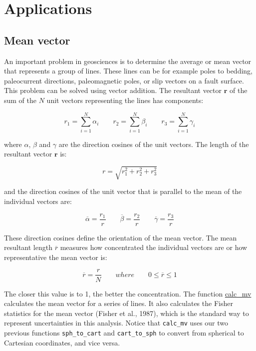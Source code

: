 \documentclass[a4paper , 12pt]{book}
\newcommand{\code}[1]{\colorbox{light-gray}{\texttt{#1}}}
\begin{document}
\section{Applications}

\subsection{Mean vector}\label{MeanVector}

An important problem in geosciences is to determine the average or mean vector that represents a group of lines. These lines can be for example poles to bedding, paleocurrent directions, paleomagnetic poles, or slip vectors on a fault surface. This problem can be solved using vector addition. The resultant vector $\mathbf{r}$ of the sum of the $N$ unit vectors representing the lines has components:

\begin{equation}
    r_1=\sum_{i=1}^{N}\alpha_i\qquad r_2=\sum_{i=1}^{N}\beta_i\qquad r_3=\sum_{i=1}^{N}\gamma_i \tag{4.15a}
\end{equation}

where $\alpha$, $\beta$ and $\gamma$ are the direction cosines of the unit vectors. The length of the resultant vector $\mathbf{r}$ is:

\begin{equation}
    r=\sqrt{r_1^2+r_2^2+r_3^2} \tag{4.15b}
\end{equation}

and the direction cosines of the unit vector that is parallel to the mean of the individual vectors are:

\begin{equation}
    \overline{\alpha}=\frac{r_1}{r}\qquad \overline{\beta}=\frac{r_2}{r}\qquad \overline{\gamma}=\frac{r_3}{r} \tag{4.15c}
\end{equation}

These direction cosines define the orientation of the mean vector. The mean resultant length $\overline{r}$ measures how concentrated the individual vectors are or how representative the mean vector is:

\begin{equation}
    \overline{r}=\frac{r}{N}\qquad where\qquad 0\leq\overline{r}\leq 1 \tag{4.15d}
\end{equation}

The closer this value is to 1, the better the concentration. The function \href{https://github.com/nfcd/compGeo/blob/master/source/functions/calc_mv.py}{calc\_mv} calculates the mean vector for a series of lines. It also calculates the Fisher statistics for the mean vector (Fisher et al., 1987), which is the standard way to represent uncertainties in this analysis. Notice that \code{calc\_mv} uses our two previous functions \code{sph\_to\_cart} and \code{cart\_to\_sph} to convert from spherical to Cartesian coordinates, and vice versa.
\end{document}
